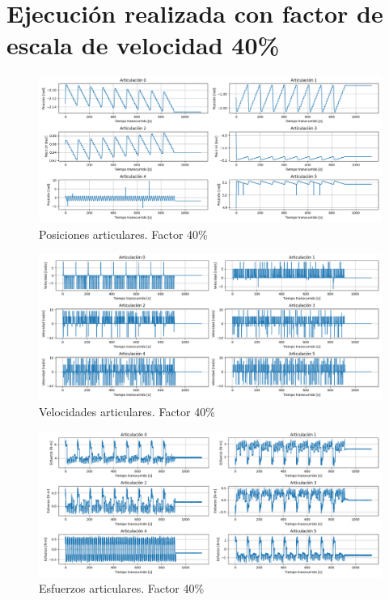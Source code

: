 \section{Ejecución realizada con factor de escala de velocidad 40\%}

\begin{figure}[H]
    \centering
    \includegraphics[scale=0.30]{figuras/ensayo_control_velocidad/posiciones articulares 0.4.png}
    \caption{Posiciones articulares. Factor 40\%}
    \label{fig:posiciones articulares 0.4}
\end{figure}

\begin{figure}[H]
    \centering
    \includegraphics[scale=0.30]{figuras/ensayo_control_velocidad/velocidad articular 0.4.png}
    \caption{Velocidades articulares. Factor 40\%}
    \label{fig:velocidades articulares 0.4}
\end{figure}

\begin{figure}[H]
    \centering
    \includegraphics[scale=0.30]{figuras/ensayo_control_velocidad/esfuerzos 0.4.png}
    \caption{Esfuerzos articulares. Factor 40\%}
    \label{fig:esfuerzos articulares 0.4}
\end{figure}

